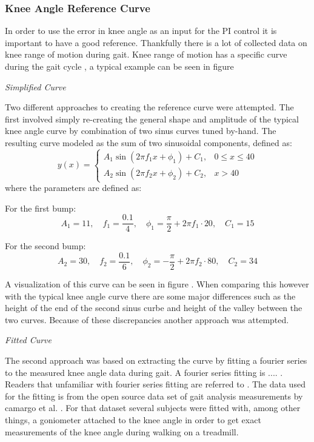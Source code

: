 

\subsubsection{Knee Angle Reference Curve}
In order to use the error in knee angle as an input for the PI control it is important to have a good reference. Thankfully there is a lot of collected data on knee range of motion during gait. Knee range of motion has a specific curve during the gait cycle , a typical example can be seen in figure  
\newline 

\textit{Simplified Curve}

Two different approaches to creating the reference curve were attempted. The first involved simply re-creating the general shape and amplitude of the typical knee angle curve by combination of two sinus curves tuned by-hand. The resulting curve modeled as the sum of two sinusoidal components, defined as:
\[
y(x) =
\begin{cases}
A_1 \sin\left(2 \pi f_1 x + \phi_1\right) + C_1, & 0 \leq x \leq 40 \\
A_2 \sin\left(2 \pi f_2 x + \phi_2\right) + C_2, & x > 40
\end{cases}
\]
where the parameters are defined as:

For the first bump:
\[
A_1 = 11, \quad f_1 = \frac{0.1}{4}, \quad \phi_1 = \frac{\pi}{2} + 2\pi f_1 \cdot 20, \quad C_1 = 15
\]

For the second bump:
\[
A_2 = 30, \quad f_2 = \frac{0.1}{6}, \quad \phi_2 = -\frac{\pi}{2} + 2\pi f_2 \cdot 80, \quad C_2 = 34
\]

A visualization of this curve can be seen in figure . When comparing this however with the typical knee angle curve there are some major differences such as the height of the end of the second sinus curbe and height of the valley between the two curves. Because of these discrepancies another approach was attempted.
\newline

\textit{Fitted Curve}

The second approach was based on extracting the curve by fitting a fourier series to the measured knee angle data during gait. A fourier series fitting is .... . Readers that unfamiliar with fourier series fitting are referred to . The data used for the fitting is from the open source data set of gait analysis measurements by camargo et al. \cite{camargo_comprehensive_2021}. For that dataset several subjects were fitted with, among other things, a goniometer attached to the knee angle in order to get exact measurements of the knee angle during walking on a treadmill. 

